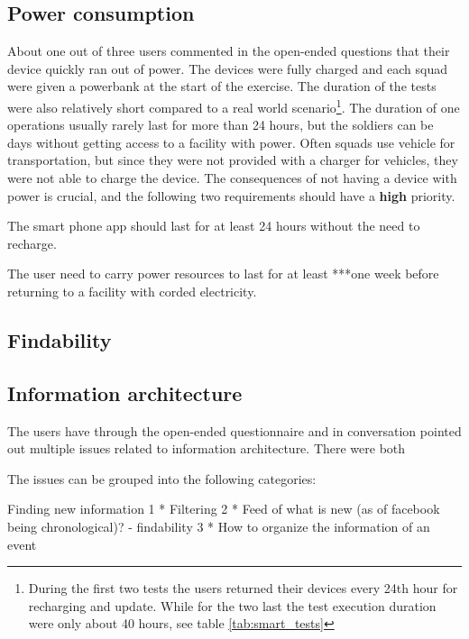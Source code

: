 \subsection{Power consumption}
About one out of three users commented in the open-ended questions that their device quickly ran out of power. The devices were fully charged and each squad were given a powerbank at the start of the exercise. The duration of the tests were also relatively short compared to a real world scenario\footnote{During the first two tests the users returned their devices every 24th hour for recharging and update. While for the two last the test execution duration were only about 40 hours, see table \ref{tab:smart_tests}}. The duration of one operations usually rarely last for more than 24 hours, but the soldiers can be days without getting access to a facility with power. Often squads use vehicle for transportation, but since they were not provided with a charger for vehicles, they were not able to charge the device. The consequences of not having a device with power is crucial, and the following two requirements should have a \textbf{high} priority. 
\begin{requirement}
The smart phone app should last for at least 24 hours without the need to recharge.
\end{requirement}
\begin{requirement}
The user need to carry power resources to last for at least ***one week before returning to a facility with corded electricity. 
\end{requirement}

\subsection{Findability}


\subsection{Information architecture}
The users have through the open-ended questionnaire and in conversation pointed out multiple issues related to information architecture. There were both  

The issues can be grouped into the following categories:

Finding new information 
1 * Filtering 
2 * Feed of what is new (as of facebook being chronological)?
	- findability
3 * How to organize the information of an event




